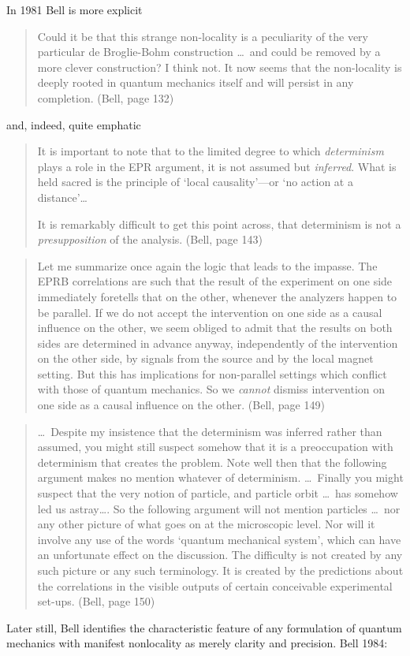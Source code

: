 \documentclass[12pt]{article}
\newcommand\bq{\begin{quotation}}
\newcommand\eq{\end{quotation}}
\begin{document}
In 1981 Bell is more explicit
\bq
Could it be that this strange non-locality is a peculiarity of the very
particular de Broglie-Bohm construction \dots\  and could be removed by a more
clever construction? I think not. It now seems that the  non-locality is
deeply rooted in quantum mechanics itself and will persist in any
completion. (Bell, page 132)
\eq
and, indeed, quite emphatic
\bq It is important to note that to the limited degree to which {\it
determinism} plays a role in the EPR argument, it is not assumed but
{\it inferred}. What is held sacred is the principle of `local
causality'---or `no action at a distance'\dots

It is remarkably difficult to get this point across, that determinism is
not a {\it presupposition} of the analysis. (Bell, page 143)
\eq
\bq Let me summarize once again the logic that leads to the impasse. The
EPRB correlations are such that the result of the experiment on one side
immediately foretells that on the other, whenever the analyzers happen to
be parallel. If we do not accept the intervention on one side as a causal
influence on the other, we seem obliged to admit that the results on both
sides are determined in advance anyway, independently of the intervention
on the other side, by signals from the source and by the local magnet
setting. But this has implications for non-parallel settings which conflict
with those of quantum mechanics. So we {\it cannot} dismiss intervention
on one side as a causal influence on the other. (Bell, page 149)
\eq
\bq  \dots\  Despite my insistence that the determinism was inferred
rather than assumed, you might still suspect somehow that it is a
preoccupation with determinism that creates the problem. Note well then
that the following argument makes no mention whatever of determinism. \dots\
Finally you might suspect that the very notion of particle, and particle
orbit \dots\  has somehow led us astray\dots. So the following argument
will not
mention particles \dots\  nor any other picture of what goes on at the
microscopic level. Nor will it involve any use of the words `quantum
mechanical system', which can have an unfortunate effect on the discussion.
The difficulty is not created by any such picture or any such terminology.
It is created by the predictions about the correlations in the visible
outputs of certain conceivable experimental set-ups. (Bell, page 150)
\eq

Later still,  Bell identifies the characteristic  feature of any formulation of
quantum mechanics with  manifest nonlocality  as merely
clarity and precision. Bell 1984:
\end{document}
